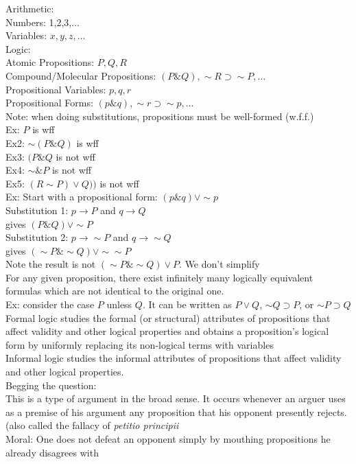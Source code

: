 Arithmetic:\\
Numbers: 1,2,3,$\ldots$\\
Variables: $x,y,z,\ldots$\\
Logic:\\
Atomic Propositions: $P,Q,R$\\
Compound/Molecular Propositions: $(P\&Q),\sim R\supset\sim P,\ldots$\\
Propositional Variables: $p,q,r$\\
Propositional Forms: $(p\&q),\sim r\supset\sim p,\ldots$\\
Note: when doing substitutions, propositions must be well-formed (w.f.f.)\\
Ex: $P$ is wff\\
Ex2: $\sim(P\&Q)$ is wff\\
Ex3: $(P\&Q$ is not wff\\
Ex4: $\sim \&P$ is not wff\\
Ex5: $(R\sim P)\vee Q))$ is not wff\\

Ex: Start with a propositional form: $(p\& q)\vee \sim p$\\
Substitution 1: $p\to P$ and $q\to Q$\\
gives $(P\&Q)\vee \sim P$\\
Substitution 2: $p\to \sim P$ and $q\to\sim Q$\\
gives $(\sim P\&\sim Q)\vee \sim\sim P$\\
Note the result is not $(\sim P\&\sim Q)\vee P$. We don't simplify\\
For any given proposition, there exist infinitely many logically equivalent formulas which are not identical to the original one.\\

Ex: consider the case $P$ unless $Q$. It can be written as $P\vee Q$, $\sim Q\supset P$, or $\sim P\supset Q$\\

Formal logic studies the formal (or structural) attributes of propositions that affect validity and other logical properties and obtains a proposition's logical form by uniformly replacing its non-logical terms with variables\\
Informal logic studies the informal attributes of propositions that affect validity and other logical properties.\\

Begging the question:\\
This is a type of argument in the broad sense. It occurs whenever an arguer uses as a premise of his argument any proposition that his opponent presently rejects. (also called the fallacy of \textit{petitio principii}\\
Moral: One does not defeat an opponent simply by mouthing propositions he already disagrees with\\

